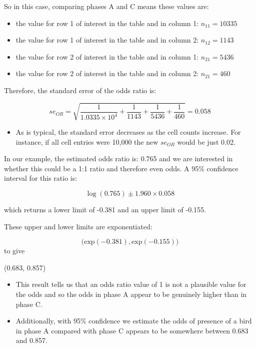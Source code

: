 \documentclass[
  oneside]{krantz}
\providecommand{\tightlist}{%
  \setlength{\itemsep}{0pt}\setlength{\parskip}{0pt}}
\begin{document}
So in this case, comparing phases A and C means these values are:

\begin{itemize}
\tightlist
\item
  the value for row 1 of interest in the table and in column 1: \(n_{11}=10335\)
\item
  the value for row 1 of interest in the table and in column 2: \(n_{12}=1143\)
\item
  the value for row 2 of interest in the table and in column 1: \(n_{21}=5436\)
\item
  the value for row 2 of interest in the table and in column 2: \(n_{21}=460\)
\end{itemize}

Therefore, the standard error of the odds ratio is:

\[se_{OR}=\sqrt{\frac{1}{\ensuremath{1.0335\times 10^{4}}}+\frac{1}{1143}+\frac{1}{5436}+\frac{1}{460}}=0.058\]

\begin{itemize}
\tightlist
\item
  As is typical, the standard error decreases as the cell counts increase. For instance, if all cell entries were 10,000 the new \(se_{OR}\) would be just 0.02.
\end{itemize}

In our example, the estimated odds ratio is: 0.765 and we are interested in whether this could be a 1:1 ratio and therefore even odds.
A 95\% confidence interval for this ratio is:

\[\log(0.765) \pm 1.960 \times 0.058\]

which returns a lower limit of -0.381 and an upper limit of -0.155.

These upper and lower limits are exponentiated:

\[\big(\text{exp}(-0.381),  \text{exp}(-0.155)\big)\]
to give

\begin{center}
(0.683, 0.857)
\end{center}

\begin{itemize}
\item
  This result tells us that an odds ratio value of 1 is not a plausible value for the odds and so the odds in phase A appear to be genuinely higher than in phase C.
\item
  Additionally, with 95\% confidence we estimate the odds of presence of a bird in phase A compared with phase C appears to be somewhere between 0.683 and 0.857.
\end{itemize}
\end{document}
